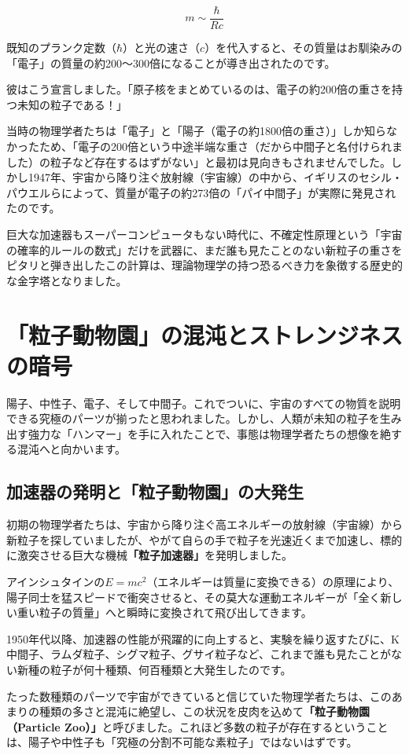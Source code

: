 \[
m \sim \frac{\hbar}{Rc}
\]

既知のプランク定数（\(\hbar\)）と光の速さ（\(c\)）を代入すると、その質量はお馴染みの「電子」の質量の約200〜300倍になることが導き出されたのです。

彼はこう宣言しました。「原子核をまとめているのは、電子の約200倍の重さを持つ未知の粒子である！」

当時の物理学者たちは「電子」と「陽子（電子の約1800倍の重さ）」しか知らなかったため、「電子の200倍という中途半端な重さ（だから中間子と名付けられました）の粒子など存在するはずがない」と最初は見向きもされませんでした。しかし1947年、宇宙から降り注ぐ放射線（宇宙線）の中から、イギリスのセシル・パウエルらによって、質量が電子の約273倍の「パイ中間子」が実際に発見されたのです。

巨大な加速器もスーパーコンピュータもない時代に、不確定性原理という「宇宙の確率的ルールの数式」だけを武器に、まだ誰も見たことのない新粒子の重さをピタリと弾き出したこの計算は、理論物理学の持つ恐るべき力を象徴する歴史的な金字塔となりました。

\section{「粒子動物園」の混沌とストレンジネスの暗号}

陽子、中性子、電子、そして中間子。これでついに、宇宙のすべての物質を説明できる究極のパーツが揃ったと思われました。しかし、人類が未知の粒子を生み出す強力な「ハンマー」を手に入れたことで、事態は物理学者たちの想像を絶する混沌へと向かいます。

\subsection{加速器の発明と「粒子動物園」の大発生}

初期の物理学者たちは、宇宙から降り注ぐ高エネルギーの放射線（宇宙線）から新粒子を探していましたが、やがて自らの手で粒子を光速近くまで加速し、標的に激突させる巨大な機械\textbf{「粒子加速器」}を発明しました。

アインシュタインの\(E=mc^2\)（エネルギーは質量に変換できる）の原理により、陽子同士を猛スピードで衝突させると、その莫大な運動エネルギーが「全く新しい重い粒子の質量」へと瞬時に変換されて飛び出してきます。

1950年代以降、加速器の性能が飛躍的に向上すると、実験を繰り返すたびに、K中間子、ラムダ粒子、シグマ粒子、グサイ粒子など、これまで誰も見たことがない新種の粒子が何十種類、何百種類と大発生したのです。

たった数種類のパーツで宇宙ができていると信じていた物理学者たちは、このあまりの種類の多さと混沌に絶望し、この状況を皮肉を込めて\textbf{「粒子動物園（Particle Zoo）」}と呼びました。これほど多数の粒子が存在するということは、陽子や中性子も「究極の分割不可能な素粒子」ではないはずです。

